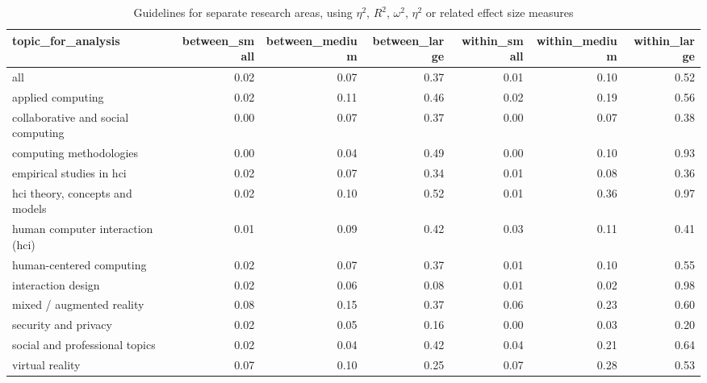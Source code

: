 \begin{table}[ht]
\centering
\begin{tabular}{lrrrrrr}
  \hline
topic\_for\_analysis & between\_small & between\_medium & between\_large & within\_small & within\_medium & within\_large \\ 
  \hline
all & 0.02 & 0.07 & 0.37 & 0.01 & 0.10 & 0.52 \\ 
  applied computing & 0.02 & 0.11 & 0.46 & 0.02 & 0.19 & 0.56 \\ 
  collaborative and social computing & 0.00 & 0.07 & 0.37 & 0.00 & 0.07 & 0.38 \\ 
  computing methodologies & 0.00 & 0.04 & 0.49 & 0.00 & 0.10 & 0.93 \\ 
  empirical studies in hci & 0.02 & 0.07 & 0.34 & 0.01 & 0.08 & 0.36 \\ 
  hci theory, concepts and models & 0.02 & 0.10 & 0.52 & 0.01 & 0.36 & 0.97 \\ 
  human computer interaction (hci) & 0.01 & 0.09 & 0.42 & 0.03 & 0.11 & 0.41 \\ 
  human-centered computing & 0.02 & 0.07 & 0.37 & 0.01 & 0.10 & 0.55 \\ 
  interaction design & 0.02 & 0.06 & 0.08 & 0.01 & 0.02 & 0.98 \\ 
  mixed / augmented reality & 0.08 & 0.15 & 0.37 & 0.06 & 0.23 & 0.60 \\ 
  security and privacy & 0.02 & 0.05 & 0.16 & 0.00 & 0.03 & 0.20 \\ 
  social and professional topics & 0.02 & 0.04 & 0.42 & 0.04 & 0.21 & 0.64 \\ 
  virtual reality & 0.07 & 0.10 & 0.25 & 0.07 & 0.28 & 0.53 \\ 
   \hline
\end{tabular}
\caption{Guidelines for separate research areas, using $\eta^2$, $R^2$, $\omega^2$, $\eta^2$ or related effect size measures} 
\label{tab:es guidelines etasquared-es different topics}
\end{table}

